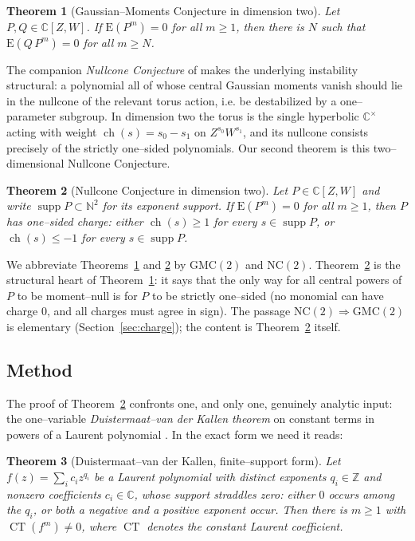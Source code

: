 \documentclass[11pt,reqno]{amsart}
\theoremstyle{plain}
\newtheorem{theorem}{Theorem}[section]
\theoremstyle{definition}
\newcommand{\C}{\mathbb{C}}
\newcommand{\Z}{\mathbb{Z}}
\newcommand{\N}{\mathbb{N}}
\newcommand{\E}{\mathrm{E}}
\newcommand{\CT}{\operatorname{CT}}
\newcommand{\ch}{\operatorname{ch}}
\newcommand{\supp}{\operatorname{supp}}
\begin{document}
\begin{theorem}[Gaussian--Moments Conjecture in dimension two]\label{thm:gmc2}
Let $P,Q\in\C[Z,W]$. If $\E(P^m)=0$ for all $m\ge 1$, then there is $N$ such that $\E(Q\,P^m)=0$
for all $m\ge N$.
\end{theorem}

The companion \emph{Nullcone Conjecture} of \cite{DerksenEssenZhao2017} makes the underlying instability
structural: a polynomial all of whose central Gaussian moments vanish should lie in the nullcone of the
relevant torus action, i.e. be destabilized by a one--parameter subgroup. In dimension two the torus is
the single hyperbolic $\C^\times$ acting with weight $\ch(s)=s_0-s_1$ on $Z^{s_0}W^{s_1}$, and its
nullcone consists precisely of the strictly one--sided polynomials. Our second theorem is this
two--dimensional Nullcone Conjecture.

\begin{theorem}[Nullcone Conjecture in dimension two]\label{thm:nc2}
Let $P\in\C[Z,W]$ and write $\supp P\subset\N^2$ for its exponent support. If $\E(P^m)=0$ for all
$m\ge 1$, then $P$ has one--sided charge:
either $\ch(s)\ge 1$ for every $s\in\supp P$, or $\ch(s)\le -1$ for every $s\in\supp P$.
\end{theorem}

We abbreviate Theorems~\ref{thm:gmc2} and \ref{thm:nc2} by $\mathrm{GMC}(2)$ and $\mathrm{NC}(2)$.
Theorem~\ref{thm:nc2} is the structural heart of Theorem~\ref{thm:gmc2}: it says that the only way for
all central powers of $P$ to be moment--null is for $P$ to be strictly one--sided (no monomial can have
charge $0$, and all charges must agree in sign). The passage $\mathrm{NC}(2)\Rightarrow\mathrm{GMC}(2)$
is elementary (Section~\ref{sec:charge}); the content is Theorem~\ref{thm:nc2} itself.

\subsection{Method}
The proof of Theorem~\ref{thm:nc2} confronts one, and only one, genuinely analytic input: the
one--variable \emph{Duistermaat--van der Kallen theorem} on constant terms in powers of a Laurent
polynomial \cite{DvdK1998}. In the exact form we need it reads:

\begin{theorem}[Duistermaat--van der Kallen, finite--support form]\label{thm:dvdk}
Let $f(z)=\sum_{i} c_i z^{q_i}$ be a Laurent polynomial with distinct exponents $q_i\in\Z$ and nonzero
coefficients $c_i\in\C$, whose support \emph{straddles zero}: either $0$ occurs among the $q_i$, or both a
negative and a positive exponent occur. Then there is $m\ge 1$ with $\CT(f^m)\ne 0$, where $\CT$ denotes
the constant Laurent coefficient.
\end{theorem}
\end{document}
